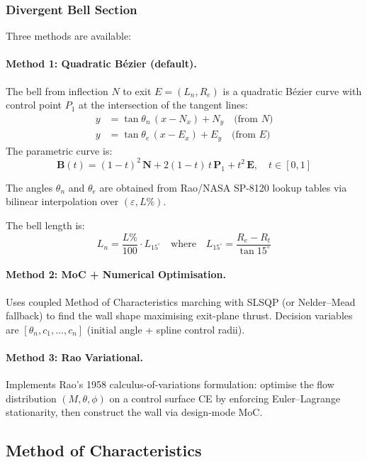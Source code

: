 \documentclass[11pt,a4paper]{article}
\begin{document}
\subsubsection{Divergent Bell Section}
Three methods are available:

\paragraph{Method 1: Quadratic B\'ezier (default).}
The bell from inflection $N$ to exit $E=(L_n, R_e)$ is a quadratic B\'ezier curve with control point $P_1$ at the intersection of the tangent lines:
\begin{align}
y &= \tan\theta_n\,(x - N_x) + N_y \quad\text{(from $N$)}\\
y &= \tan\theta_e\,(x - E_x) + E_y \quad\text{(from $E$)}
\end{align}
The parametric curve is:
\begin{equation}
\mathbf{B}(t) = (1-t)^2\,\mathbf{N} + 2(1-t)\,t\,\mathbf{P}_1 + t^2\,\mathbf{E}, \quad t\in[0,1]
\end{equation}

The angles $\theta_n$ and $\theta_e$ are obtained from Rao/NASA SP-8120 lookup tables via bilinear interpolation over $(\varepsilon, L\%)$.

The bell length is:
\begin{equation}
L_n = \frac{L\%}{100}\cdot L_{15^\circ} \quad\text{where}\quad L_{15^\circ} = \frac{R_e - R_t}{\tan 15^\circ}
\end{equation}

\paragraph{Method 2: MoC + Numerical Optimisation.}
Uses coupled Method of Characteristics marching with SLSQP (or Nelder--Mead fallback) to find the wall shape maximising exit-plane thrust. Decision variables are $[\theta_n, c_1, \ldots, c_n]$ (initial angle + spline control radii).

\paragraph{Method 3: Rao Variational.}
Implements Rao's 1958 calculus-of-variations formulation: optimise the flow distribution $(M, \theta, \phi)$ on a control surface CE by enforcing Euler--Lagrange stationarity, then construct the wall via design-mode MoC.

\subsection{Method of Characteristics}
\end{document}
